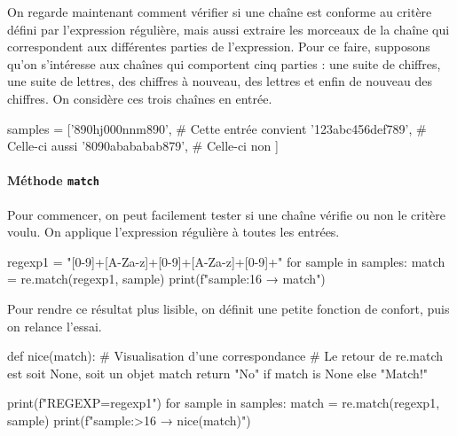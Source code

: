 On regarde maintenant comment vérifier si une chaîne est conforme au critère défini par l'expression régulière, mais aussi extraire les morceaux de la chaîne qui correspondent aux différentes parties de l'expression. Pour ce faire, supposons qu'on s'intéresse aux chaînes qui comportent cinq parties : une suite de chiffres, une suite de lettres, des chiffres à nouveau, des lettres et enfin de nouveau des chiffres. On considère ces trois chaînes en entrée.

\begin{idleconsole}
	\begin{pyconsole}
samples = ['890hj000nnm890',   # Cette entrée convient
          '123abc456def789',   # Celle-ci aussi
          '8090abababab879',   # Celle-ci non
          ]
	\end{pyconsole}
\end{idleconsole}

\vspace{1pt}

\paragraph{Méthode {\normalfont\texttt{match}}}
Pour commencer, on peut facilement tester si une chaîne vérifie ou non le critère voulu. On applique l'expression régulière à toutes les entrées.

\begin{idleconsole*}
	\begin{pyconsole}
regexp1 = "[0-9]+[A-Za-z]+[0-9]+[A-Za-z]+[0-9]+"
for sample in samples:
    match = re.match(regexp1, sample)
    print(f"{sample:16} → {match}")

	\end{pyconsole}
\end{idleconsole*}

Pour rendre ce résultat plus lisible, on définit une petite fonction de confort, puis on relance l'essai.

\begin{idleconsole}
	\begin{pyconsole}
def nice(match): # Visualisation d'une correspondance
    # Le retour de re.match est soit None, soit un objet match
    return "No" if match is None else "Match!"

print(f"REGEXP={regexp1}\n")
for sample in samples:
    match = re.match(regexp1, sample)
    print(f"{sample:>16} → {nice(match)}")

	\end{pyconsole}
\end{idleconsole}


